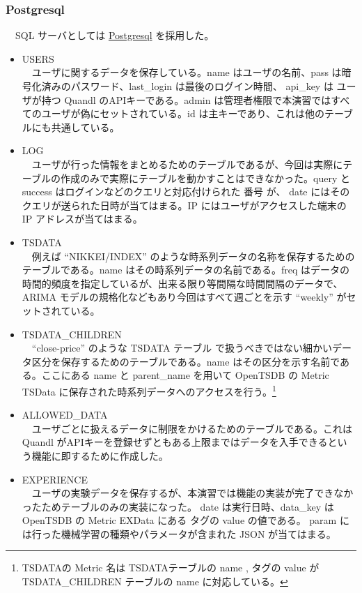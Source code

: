 \documentclass{scrartcl}
\begin{document}
\subsubsection{Postgresql}
\label{sec:org6e34b61}
　SQL サーバとしては \href{https://www.postgresql.org/}{Postgresql} を採用した。\\
\begin{itemize}
\item USERS\\
　ユーザに関するデータを保存している。name はユーザの名前、pass は暗号化済みのパスワード、last\_login は最後のログイン時間、 api\_key は ユーザが持つ Quandl のAPIキーである。admin は管理者権限で本演習ではすべてのユーザが偽にセットされている。id は主キーであり、これは他のテーブルにも共通している。\\
\item LOG\\
　ユーザが行った情報をまとめるためのテーブルであるが、今回は実際にテーブルの作成のみで実際にテーブルを動かすことはできなかった。query と success はログインなどのクエリと対応付けられた 番号 が、 date にはそのクエリが送られた日時が当てはまる。IP にはユーザがアクセスした端末の IP アドレスが当てはまる。\\
\item TSDATA\\
　例えば ``NIKKEI/INDEX'' のような時系列データの名称を保存するためのテーブルである。name はその時系列データの名前である。freq はデータの時間的頻度を指定しているが、出来る限り等間隔な時間間隔のデータで、ARIMA モデルの規格化などもあり今回はすべて週ごとを示す ``weekly'' がセットされている。\\
\item TSDATA\_CHILDREN\\
　``close-price'' のような TSDATA テーブル で扱うべきではない細かいデータ区分を保存するためのテーブルである。name はその区分を示す名前である。ここにある name と parent\_name を用いて OpenTSDB の Metric TSData に保存された時系列データへのアクセスを行う。\footnote{TSDATAの Metric 名は TSDATAテーブルの name , タグの value が TSDATA_CHILDREN テーブルの name に対応している。}\\
\item ALLOWED\_DATA\\
　ユーザごとに扱えるデータに制限をかけるためのテーブルである。これは Quandl がAPIキーを登録せずともある上限まではデータを入手できるという機能に即するために作成した。\\
\item EXPERIENCE\\
　ユーザの実験データを保存するが、本演習では機能の実装が完了できなかったためテーブルのみの実装になった。 date は実行日時、data\_key は OpenTSDB の Metric EXData にある タグの value の値である。 param には行った機械学習の種類やパラメータが含まれた JSON が当てはまる。\\
\end{itemize}
\end{document}

